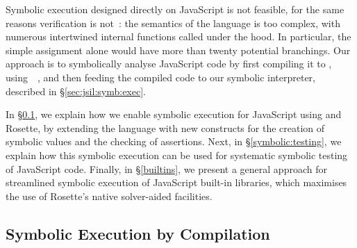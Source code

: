 Symbolic execution designed directly on JavaScript is not feasible, for the same reasons verification is not~\cite{JoseCADE}: the semantics of the language is too complex, with numerous intertwined internal functions called under the hood. 
In particular, the simple assignment alone would have more than twenty potential branchings. 
Our approach is to symbolically analyse JavaScript code by first compiling it to \jsil, using~\JSComp~\cite{javert}, and then feeding the compiled \jsil code to our \jsil symbolic interpreter, described in \S\ref{sec:jsil:symb:exec}.

In \S\ref{symb:exec:comp}, we explain how we enable symbolic execution for JavaScript using \JSComp and Rosette, by extending the language with new constructs for the creation of symbolic values and the checking of assertions.
Next, in \S\ref{symbolic:testing}, we explain how this symbolic execution can be used for systematic symbolic testing of JavaScript code. 
Finally, in \S\ref{builtins}, we present
a general approach for streamlined symbolic execution of JavaScript built-in libraries, which maximises the use of Rosette's native solver-aided facilities.



\subsection{Symbolic Execution by Compilation} 
\label{symb:exec:comp}

